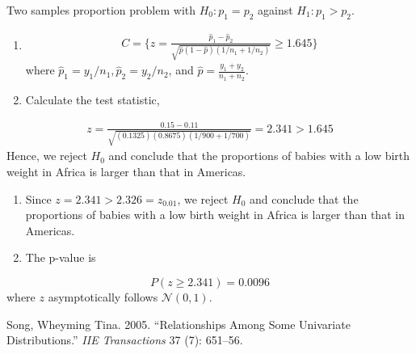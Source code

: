 \documentclass[
]{book}
\theoremstyle{definition}
\theoremstyle{definition}
\theoremstyle{definition}
\theoremstyle{remark}
\begin{document}
Two samples proportion problem with \(H_0:p_1=p_2\) against \(H_1:p_1>p_2\).

\begin{enumerate}
\def\labelenumi{\arabic{enumi}.}
\item
  \begin{align}
  C=\{z=\frac{\hat{p}_{1}-\hat{p}_{2}}{\sqrt{\hat{p}(1-\hat{p})\left(1 / n_{1}+1 / n_{2}\right)}} \geq 1.645\}
  \end{align}
  where \(\hat p_1 = y_1/n_1,\hat p_2 = y_2/n_2\), and \(\hat p = \frac{y_1+y_2}{n_1+n_2}\).
\item
  Calculate the test statistic,
\end{enumerate}

\begin{align}
z=\frac{0.15-0.11}{\sqrt{(0.1325)(0.8675)(1 / 900+1 / 700)}}=2.341>1.645
\end{align}
Hence, we reject \(H_0\) and conclude that the proportions of babies with a low birth weight in Africa is larger than that in Americas.

\begin{enumerate}
\def\labelenumi{\arabic{enumi}.}
\setcounter{enumi}{2}
\item
  Since \(z=2.341>2.326=z_{0.01}\), we reject \(H_0\) and conclude that the proportions of babies with a low birth weight in Africa is larger than that in Americas.
\item
  The p-value is
\end{enumerate}

\begin{equation}
P(z \geq 2.341)=0.0096
\end{equation}
where \(z\) asymptotically follows \(\mathcal{N}(0,1)\).

\hypertarget{refs}{}
\leavevmode\hypertarget{ref-song2005relationships}{}%
Song, Wheyming Tina. 2005. ``Relationships Among Some Univariate Distributions.'' \emph{IIE Transactions} 37 (7): 651--56.
\end{document}
